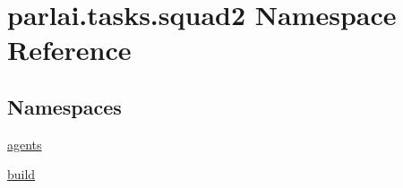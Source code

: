 \hypertarget{namespaceparlai_1_1tasks_1_1squad2}{}\section{parlai.\+tasks.\+squad2 Namespace Reference}
\label{namespaceparlai_1_1tasks_1_1squad2}
\subsection*{Namespaces}
\begin{DoxyCompactItemize}
\item 
 \hyperlink{namespaceparlai_1_1tasks_1_1squad2_1_1agents}{agents}
\item 
 \hyperlink{namespaceparlai_1_1tasks_1_1squad2_1_1build}{build}
\end{DoxyCompactItemize}
